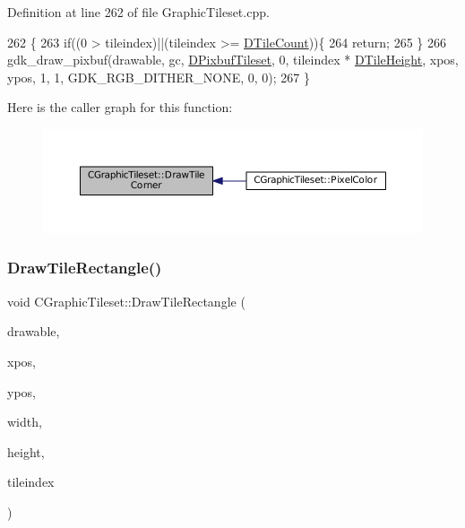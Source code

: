Definition at line 262 of file Graphic\+Tileset.\+cpp.


\begin{DoxyCode}
262                                                                                                          \{
263     \textcolor{keywordflow}{if}((0 > tileindex)||(tileindex >= \hyperlink{classCGraphicTileset_a39d942b370e47f441bf97385eb1037c8}{DTileCount}))\{
264         \textcolor{keywordflow}{return};
265     \}
266     gdk\_draw\_pixbuf(drawable, gc, \hyperlink{classCGraphicTileset_a5d5adfcdbb347a6df3f57535ca08e3ef}{DPixbufTileset}, 0, tileindex * 
      \hyperlink{classCGraphicTileset_af48f32e07d5fe69afd5f764318cc3244}{DTileHeight}, xpos, ypos, 1, 1, GDK\_RGB\_DITHER\_NONE, 0, 0);
267 \}
\end{DoxyCode}
Here is the caller graph for this function\+:\nopagebreak
\begin{figure}[H]
\begin{center}
\leavevmode
\includegraphics[width=350pt]{classCGraphicTileset_abf87dd71c8bf50b8878c66a5bdb2c7e7_icgraph}
\end{center}
\end{figure}
\hypertarget{classCGraphicTileset_a81114be934d1efca29eb194fc2429658}{}\label{classCGraphicTileset_a81114be934d1efca29eb194fc2429658} 
\subsubsection{\texorpdfstring{Draw\+Tile\+Rectangle()}{DrawTileRectangle()}}
{\footnotesize\ttfamily void C\+Graphic\+Tileset\+::\+Draw\+Tile\+Rectangle (\begin{DoxyParamCaption}\item[{Gdk\+Drawable $\ast$}]{drawable,  }\item[{gint}]{xpos,  }\item[{gint}]{ypos,  }\item[{gint}]{width,  }\item[{gint}]{height,  }\item[{int}]{tileindex }\end{DoxyParamCaption})}




